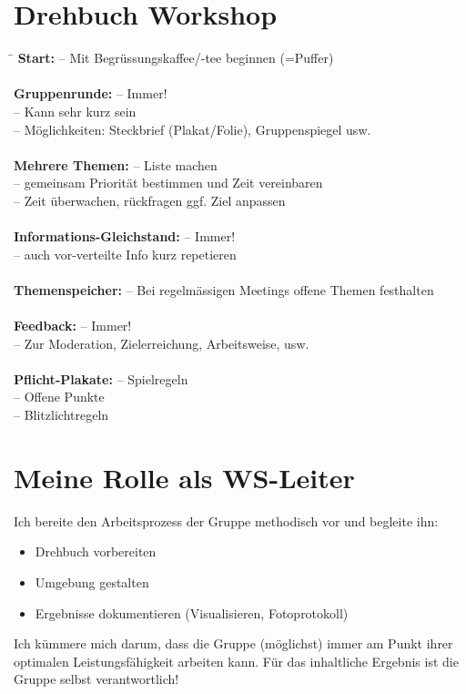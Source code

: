 \section{Drehbuch Workshop}

\begin{tabbing}
	\hspace{6cm}\=\kill
	\textbf{Start:} \> -- Mit Begrüssungskaffee/-tee beginnen (=Puffer) \\ \\
	\textbf{Gruppenrunde:} \> -- Immer! \\
						   \> -- Kann sehr kurz sein \\
						   \> -- Möglichkeiten: Steckbrief (Plakat/Folie), Gruppenspiegel usw. \\ \\
	\textbf{Mehrere Themen:} \> -- Liste machen \\ 
							\> -- gemeinsam Priorität bestimmen und Zeit vereinbaren \\
							\> -- Zeit überwachen, rückfragen ggf. Ziel anpassen \\ \\
	\textbf{Informations-Gleichstand:} \> -- Immer! \\ 
									   \> -- auch vor-verteilte Info kurz repetieren \\ \\
	\textbf{Themenspeicher:} \> -- Bei regelmässigen Meetings offene Themen festhalten \\ \\
	\textbf{Feedback:} \> -- Immer! \\
					   \> -- Zur Moderation, Zielerreichung, Arbeitsweise, usw. \\ \\
	\textbf{Pflicht-Plakate:} \> -- Spielregeln \\
							  \> -- Offene Punkte \\
							  \> -- Blitzlichtregeln
\end{tabbing}

\section{Meine Rolle als WS-Leiter}

Ich bereite den Arbeitsprozess der Gruppe methodisch vor und begleite ihn:
\begin{itemize}
	\item Drehbuch vorbereiten
	\item Umgebung gestalten
	\item Ergebnisse dokumentieren (Visualisieren, Fotoprotokoll)
\end{itemize}
Ich kümmere mich darum, dass die Gruppe (möglichst) immer am Punkt ihrer optimalen Leistungsfähigkeit arbeiten kann. Für das inhaltliche Ergebnis ist die Gruppe selbst verantwortlich!

